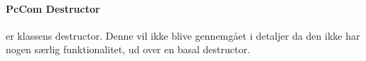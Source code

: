 \paragraph{PcCom Destructor} er klassens destructor. Denne vil ikke blive gennemgået i detaljer da den ikke har nogen særlig funktionalitet, ud over en basal destructor.




%
%
%
%
%
%
%
%
